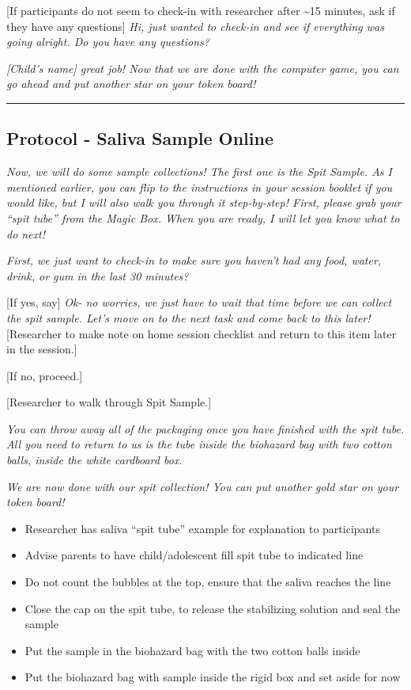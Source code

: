 \documentclass[]{book}
\begin{document}
{[}If participants do not seem to check-in with researcher after \textasciitilde{}15 minutes, ask if they have any questions{]} \emph{Hi, just wanted to check-in and see if everything was going alright. Do you have any questions?}

\emph{{[}Child's name{]} great job! Now that we are done with the computer game, you can go ahead and put another star on your token board!}

\begin{center}\rule{0.5\linewidth}{0.5pt}\end{center}

\hypertarget{protocol---saliva-sample-online-1}{%
\subsection{Protocol - Saliva Sample Online}\label{protocol---saliva-sample-online-1}}

\emph{Now, we will do some sample collections! The first one is the Spit Sample. As I mentioned earlier, you can flip to the instructions in your session booklet if you would like, but I will also walk you through it step-by-step! First, please grab your ``spit tube'' from the Magic Box. When you are ready, I will let you know what to do next!}

\emph{First, we just want to check-in to make sure you haven't had any food, water, drink, or gum in the last 30 minutes?}

{[}If yes, say{]} \emph{Ok- no worries, we just have to wait that time before we can collect the spit sample. Let's move on to the next task and come back to this later!} {[}Researcher to make note on home session checklist and return to this item later in the session.{]}

{[}If no, proceed.{]}

{[}Researcher to walk through Spit Sample.{]}

\emph{You can throw away all of the packaging once you have finished with the spit tube. All you need to return to us is the tube inside the biohazard bag with two cotton balls, inside the white cardboard box.}

\emph{We are now done with our spit collection! You can put another gold star on your token board!}

\begin{itemize}
\item
  Researcher has saliva ``spit tube'' example for explanation to participants
\item
  Advise parents to have child/adolescent fill spit tube to indicated line
\item
  Do not count the bubbles at the top, ensure that the saliva reaches the line
\item
  Close the cap on the spit tube, to release the stabilizing solution and seal the sample
\item
  Put the sample in the biohazard bag with the two cotton balls inside
\item
  Put the biohazard bag with sample inside the rigid box and set aside for now
\end{itemize}
\end{document}
